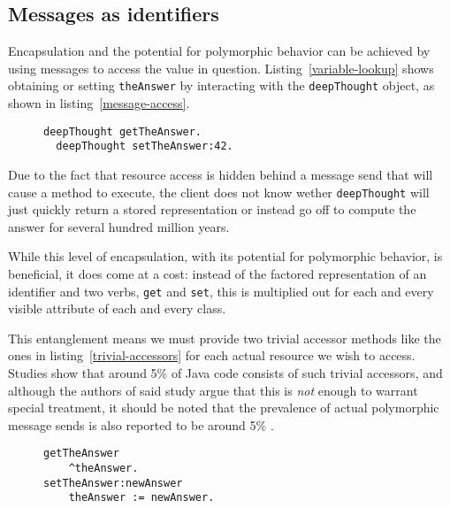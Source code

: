 \documentclass[preprint,authoryear]{llncs}
\begin{document}
\subsection{Messages as identifiers}

Encapsulation and the potential for polymorphic behavior can be achieved by using
messages to access the value in question.  Listing~\ref{variable-lookup} shows 
obtaining or setting {\tt theAnswer} by interacting with the {\tt deepThought}\cite{adams1997hitchhiker} object,
as shown in listing~\ref{message-access}.

\begin{figure}[htbp]
\begin{lstlisting}[style=L,label=message-access,caption=Retrieve and store value via message sends.]
  deepThought getTheAnswer.
  deepThought setTheAnswer:42.
\end{lstlisting}
\end{figure}

Due to the fact that resource access is hidden behind a message send that will cause
a method to execute, the client does not know wether {\tt deepThought} will just
quickly return a stored representation or instead go off to compute the answer for 
several hundred million years. 

While this level of encapsulation, with its potential for polymorphic behavior, is 
beneficial, it does come at a cost:   instead of the factored 
representation of an identifier and two verbs, {\tt get} and {\tt set},
this is multiplied out for each and every visible attribute of 
each and every class. 
 
This entanglement means we  
must provide two trivial accessor methods like the ones in listing~\ref{trivial-accessors} for each actual resource we wish
to access.  Studies show that around 5\% of Java code consists of such trivial accessors\cite{Spinellis:2002:MPC:510857.510868}, and although the authors of said study argue that this is \emph{not} enough
to warrant special treatment, it should be noted that the prevalence of actual polymorphic 
message sends is also reported to be around 5\% \cite{Holzle:1991:ODO:646149.679193}.

\begin{figure}[htbp]
\begin{lstlisting}[style=L,label=trivial-accessors,caption=Trivial accessors.]
getTheAnswer
    ^theAnswer.
setTheAnswer:newAnswer
    theAnswer := newAnswer.
\end{lstlisting}
\end{figure}
\end{document}
